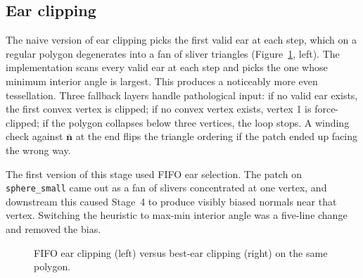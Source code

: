 \subsection*{Ear clipping}

The naive version of ear clipping picks the first valid ear at each step, which on a regular polygon degenerates into a fan of sliver triangles (Figure~\ref{fig:ear-clipping}, left). The implementation scans every valid ear at each step and picks the one whose minimum interior angle is largest. This produces a noticeably more even tessellation. Three fallback layers handle pathological input: if no valid ear exists, the first convex vertex is clipped; if no convex vertex exists, vertex 1 is force-clipped; if the polygon collapses below three vertices, the loop stops. A winding check against $\bar{\mathbf{n}}$ at the end flips the triangle ordering if the patch ended up facing the wrong way.

The first version of this stage used FIFO ear selection. The patch on \texttt{sphere\_small} came out as a fan of slivers concentrated at one vertex, and downstream this caused Stage~4 to produce visibly biased normals near that vertex. Switching the heuristic to max-min interior angle was a five-line change and removed the bias.

\begin{figure}[H]
    \centering
    \caption{FIFO ear clipping (left) versus best-ear clipping (right) on the same polygon.}
    \label{fig:ear-clipping}
\end{figure}

